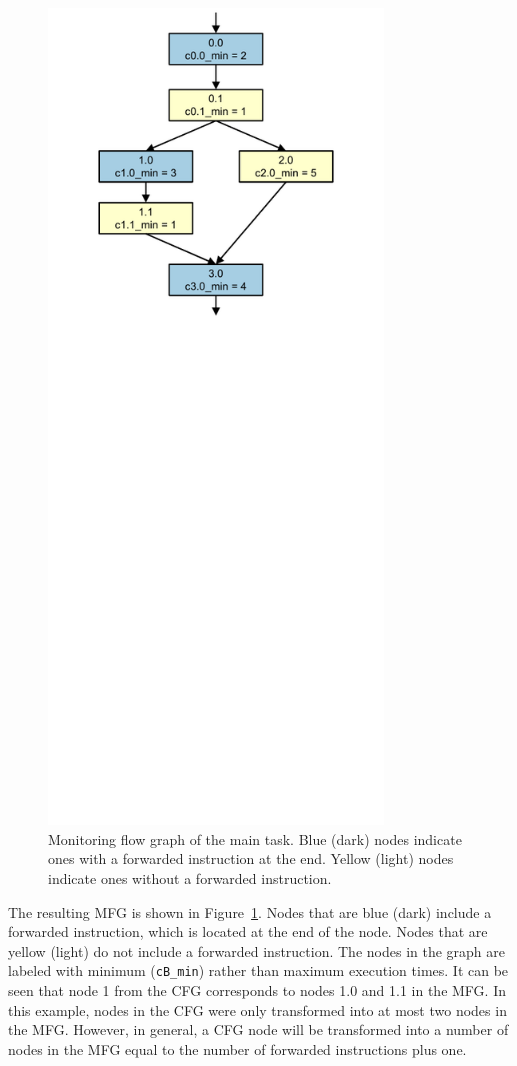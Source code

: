 \begin{figure}
  \begin{center}
    \includegraphics[width=3.5in]{monitoring_wcet/figs/mfg_example.pdf}
    \caption{Monitoring flow graph of the main task. Blue (dark) nodes indicate
    ones with a forwarded instruction at the end. Yellow (light) nodes indicate
    ones without a forwarded instruction.}
    \label{fig:monitoring_wcet.example.mfg}
  \end{center}
\end{figure}

The resulting MFG is shown in Figure~\ref{fig:monitoring_wcet.example.mfg}.
Nodes that are blue (dark) include a forwarded instruction, which is located at
the end of the node. Nodes that are yellow (light) do not include a forwarded
instruction. The nodes in the graph are labeled with minimum ({\tt cB\_min})
rather than maximum execution times. It can be seen that node 1 from the CFG
corresponds to nodes 1.0 and 1.1 in the MFG. In this example, nodes in the CFG
were only transformed into at most two nodes in the MFG.  However, in general,
a CFG node will be transformed into a number of nodes in the MFG equal to the
number of forwarded instructions plus one.

